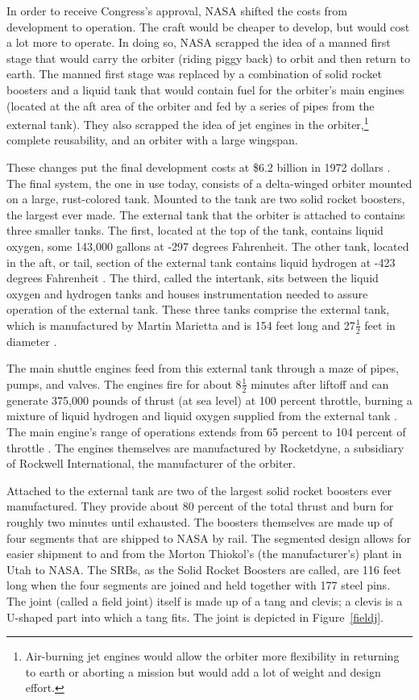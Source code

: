 In order to receive Congress's approval, NASA shifted the costs from development to operation. The craft would be cheaper to develop, but would cost a lot more to operate. In doing so, NASA scrapped the idea of a manned first stage that would carry the orbiter (riding piggy back) to orbit and then return to earth. The manned first stage was replaced by a combination of solid rocket boosters and a liquid tank that would contain fuel for the orbiter's main engines (located at the aft area of the orbiter and fed by a series of pipes from the external tank). They also scrapped the idea of jet engines in the orbiter,\footnote{Air-burning jet engines would allow the orbiter more flexibility in returning to earth or aborting a mission but would add a lot of weight and design effort.} complete reusability, and an orbiter with a large wingspan.

These changes put the final development costs at \$6.2 billion in 1972 dollars \cite[vol. 1, p. 4]{rogers}. The final system, the one in use today, consists of a delta-winged orbiter mounted on a large, rust-colored tank. Mounted to the tank are two solid rocket boosters, the largest ever made. The external tank that the orbiter is attached to contains three smaller tanks. The first, located at the top of the tank, contains liquid oxygen, some 143,000 gallons at -297 degrees Fahrenheit. The other tank, located in the aft, or tail, section of the external tank contains liquid hydrogen at -423 degrees Fahrenheit \cite[vol. 1, p. 8]{rogers}. The third, called the intertank, sits between the liquid oxygen and hydrogen tanks and houses instrumentation needed to assure operation of the external tank. These three tanks comprise the external tank, which is manufactured by Martin Marietta and is 154 feet long and 27$\frac{1}{2}$ feet in diameter \cite[vol. 1, p. 8]{rogers}.

The main shuttle engines feed from this external tank through a maze of pipes, pumps, and valves. The engines fire for about 8$\frac{1}{2}$ minutes after liftoff and can generate 375,000 pounds of thrust (at sea level) at 100 percent throttle, burning a mixture of liquid hydrogen and liquid oxygen supplied from the external tank \cite[vol. 1, p. 7]{rogers}. The main engine's range of operations extends from 65 percent to 104 percent of throttle \cite[vol. 1, p. 8]{rogers}. The engines themselves are manufactured by Rocketdyne, a subsidiary of Rockwell International, the manufacturer of the orbiter.

Attached to the external tank are two of the largest solid rocket boosters ever manufactured. They provide about 80 percent of the total thrust and burn for roughly two minutes until exhausted. The boosters themselves are made up of four segments that are shipped to NASA by rail. The segmented design allows for easier shipment to and from the Morton Thiokol's (the manufacturer's) plant in Utah to NASA. The SRBs, as the Solid Rocket Boosters are called, are 116 feet long when the four segments are joined and held together with 177 steel pins. The joint (called a field joint) itself is made up of a tang and clevis; a clevis is a U-shaped part into which a tang fits. The joint is depicted in Figure~\ref{fieldj}.

